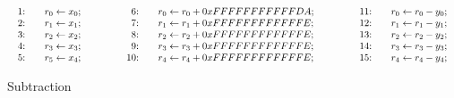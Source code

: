 \begin{figure*}
  \centering
  $
  \begin{array}{lclcl}
    \begin{array}{rcl}
    \textmd{1:} && {r}_0 \leftarrow {x}_0; \\
    \textmd{2:} && {r}_1 \leftarrow {x}_1; \\
    \textmd{3:} && {r}_2 \leftarrow {x}_2; \\
    \textmd{4:} && {r}_3 \leftarrow {x}_3; \\
    \textmd{5:} && {r}_5 \leftarrow {x}_4; \\
    \end{array}
    &\hspace{.05\textwidth}&
    \begin{array}{rcl}
    \textmd{6:} &&
      {r}_0 \leftarrow {r}_0 + {0xFFFFFFFFFFFDA}; \\
    \textmd{7:} &&
      {r}_1 \leftarrow {r}_1 + {0xFFFFFFFFFFFFE}; \\
    \textmd{8:} &&
      {r}_2 \leftarrow {r}_2 + {0xFFFFFFFFFFFFE}; \\
    \textmd{9:} &&
      {r}_3 \leftarrow {r}_3 + {0xFFFFFFFFFFFFE}; \\
    \textmd{10:} &&
      {r}_4 \leftarrow {r}_4 + {0xFFFFFFFFFFFFE}; \\
    \end{array}
    &\hspace{.05\textwidth}&
    \begin{array}{rcl}
    \textmd{11:} && {r}_0 \leftarrow {r}_0 - {y}_0; \\
    \textmd{12:} && {r}_1 \leftarrow {r}_1 - {y}_1; \\
    \textmd{13:} && {r}_2 \leftarrow {r}_2 - {y}_2; \\
    \textmd{14:} && {r}_3 \leftarrow {r}_3 - {y}_3; \\
    \textmd{15:} && {r}_4 \leftarrow {r}_4 - {y}_4;
    \end{array}
  \end{array}
  $
  \caption{Subtraction }
  \label{figure:dsl:subtraction}
\end{figure*}

